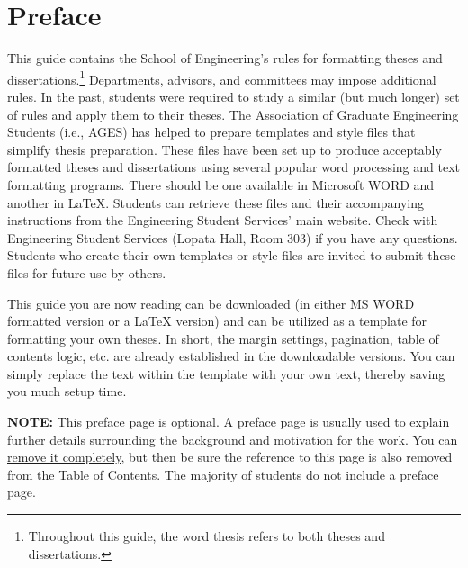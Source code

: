 



\chapter{Preface}

This guide contains the School of Engineering's rules for formatting theses and
dissertations.\footnote{Throughout this guide, the word thesis refers to both
theses and dissertations.}   Departments, advisors, and committees may impose
additional rules.  In the past, students were required to study a similar (but
much longer) set of rules and apply them to their theses.  The Association of
Graduate Engineering Students (i.e., AGES) has helped to prepare templates and
style files that simplify thesis preparation.  These files have been set up to
produce acceptably formatted theses and dissertations using several popular
word processing and text formatting programs.  There should be one available in
Microsoft WORD and another in \LaTeX{}.  Students can retrieve these files and
their accompanying instructions from the Engineering Student Services' main
website.  Check with Engineering Student Services (Lopata Hall, Room 303) if
you have any questions.  Students who create their own templates or style files
are invited to submit these files for future use by others.

This guide you are now reading can be downloaded (in either MS WORD formatted
version or a \LaTeX{} version) and can be utilized as a template for formatting
your own theses.  In short, the margin settings, pagination, table of contents
logic, etc. are already established in the downloadable versions.  You can
simply replace the text within the template with your own text, thereby saving
you much setup time.

\textbf{NOTE:} \uline{This preface page is optional.  A preface page is usually
used to explain further details surrounding the background and motivation for
the work.  You can remove it completely}, but then be sure the reference to
this page is also removed from the Table of Contents.  The majority of students
do not include a preface page.




